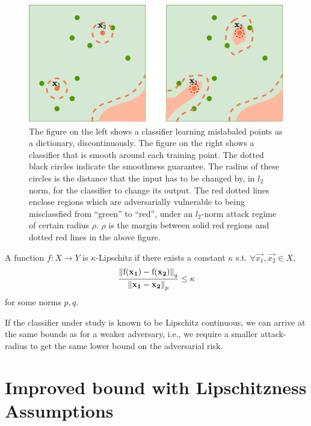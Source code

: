 \documentclass{ociamthesis}
\begin{document}
\begin{figure}
    \centering
    \includegraphics[scale=0.3]{memorizing-as-dictionary}
    \caption{The figure on the left shows a classifier learning mislabaled
    points as a dictionary, discontinuously. The figure on the right shows a
    classifier that is smooth around each training point. The dotted black
    circles indicate the smoothness guarantee. The radius of these circles is
    the distance that the input has to be changed by, in $l_2$ norm, for the
    classifier to change its output. The red dotted lines enclose regions which
    are adversarially vulnerable to being misclassfied from ``green'' to
    ``red'', under an $l_2$-norm attack regime of certain radius $\rho$. $\rho$
    is the margin between solid red regions and dotted red lines in the above
    figure.}
    \label{fig:dictionary}
\end{figure}



A function $f: X \to Y$ is $\kappa$-Lipschitz if there exists a constant
$\kappa$ s.t. $\forall \vec{x_1}, \vec{x_2} \in X$,
\begin{equation*}
    \label{eq:Lipschitz}
    \frac{\mathrm{\left\lVert{f({\mathbf{x_1}}) - f({\mathbf{x_2}})}\right\rVert}_q}
        {\mathrm{\left\lVert{{\mathbf{x_1}} - {\mathbf{x_2}}}\right\rVert}_p}
    \leq \kappa
\end{equation*}
for some norms $p, q$.

If the classifier under study is known to be Lipschitz continuous, we can arrive
at the same bounds as \citet{sanyal2021how} for a weaker adversary, i.e., we
require a smaller attack-radius to get the same lower bound on the adversarial
risk.

\section*{Improved bound with Lipschitzness Assumptions}
\end{document}
